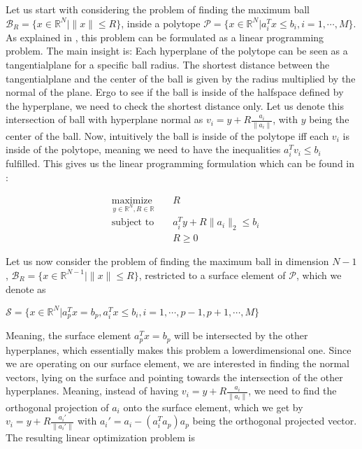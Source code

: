 \documentclass{article}
\def\R{\ensuremath{\mathbb{R}}}
\begin{document}
Let us start with considering the problem of finding the
maximum ball $\mathcal{B}_R=\{x \in \R^N | \|x\| \leq R\}$, inside a polytope
$\mathcal{P} = \{x \in \R^N| a_i^T x \leq b_i, i=1,\cdots,M\}$.  As explained in
\cite{boyd}, this problem can be formulated as a linear programming problem.
The main insight is: Each hyperplane of the polytope can be seen as a
tangentialplane for a specific ball radius. The shortest distance between the
tangentialplane and the center of the ball is given by the radius multiplied by
the normal of the plane. Ergo to see if the ball is inside of the halfspace
defined by the hyperplane, we need to check the shortest distance only. Let us
denote this intersection of ball with hyperplane normal as $v_i = y +
R\frac{a_i}{\|a_i\|}$, with $y$ being the center of the ball. Now, intuitively the ball is
inside of the polytope iff each $v_i$ is inside of the polytope, meaning we need
to have the inequalities $a_i^Tv_i \leq b_i$ fulfilled. This gives us the linear programming formulation which can be found in \cite{boyd}:

\begin{equation}
        \begin{aligned}
                &\underset{y \in \R^N, R \in \R}{\text{maximize }}&&R\\
                &\text{subject to }&& a_i^T y + R\|a_i\|_2 \leq b_i\\
                &&& R \geq 0
        \end{aligned}
\end{equation}

Let us now consider the problem of finding the maximum ball in dimension $N-1$, $\mathcal{B}_R=\{x
\in \R^{N-1} | \|x\| \leq R\}$, restricted to a surface element of $\mathcal{P}$, which we denote as
\begin{center}
$\mathcal{S} = \{x \in \R^N| a_p^Tx=b_p, a_i^T x \leq b_i, i=1,\cdots,p-1,p+1,\cdots,M\}$
\end{center}

Meaning, the surface element $a_p^Tx=b_p$ will be intersected by the other
hyperplanes, which essentially makes this problem a lowerdimensional one. Since
we are operating on our surface element, we are interested in finding the normal
vectors, lying on the surface and pointing towards the intersection of the other
hyperplanes. Meaning, instead of having $v_i = y + R\frac{a_i}{\|a_i\|}$, we
need to find the orthogonal projection of $a_i$ onto the surface element, which
we get by $v_i = y + R\frac{a_i'}{\|a_i'\|}$ with $a_i' = a_i -
(a_i^Ta_p)a_p$ being the orthogonal projected vector. The resulting
linear optimization problem is
\end{document}
